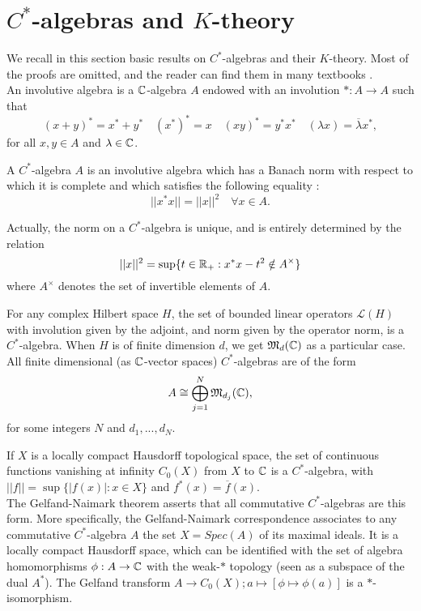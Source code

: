 \section{$C^*$-algebras and $K$-theory}

We recall in this section basic results on $C^*$-algebras and their $K$-theory. Most of the proofs are omitted, and the reader can find them in many textbooks \cite{Murphy}\cite{WeggeOlsen}.\\

An involutive algebra is a $\mathbb C$-algebra $A$ endowed with an involution $* : A\rightarrow A$ such that 
\[ (x+y)^*=x^*+y^* \quad (x^*)^* =x \quad (xy)^* = y^* x^* \quad (\lambda x ) = \overline{\lambda}x^*,\]
for all $x,y\in A$ and $\lambda\in\mathbb C$.
 
\begin{definition}
A $C^*$-algebra $A$ is an involutive algebra which has a Banach norm with respect to which it is complete and which satisfies the following equality :
\[ || x^* x || = || x ||^2\quad \forall x\in A. \]
\end{definition}

Actually, the norm on a $C^*$-algebra is unique, and is entirely determined by the relation
\[ ||x||^2 = \sup \{t\in \mathbb R_+ : x^*x-t^2 \notin A^{\times}\} \]
where $A^\times$ denotes the set of invertible elements of $A$.

\begin{Expl}
For any complex Hilbert space $H$, the set of bounded linear operators $\mathcal L(H)$ with involution given by the adjoint, and norm given by the operator norm, is a $C^*$-algebra. When $H$ is of finite dimension $d$, we get $\mathfrak M_d(\mathbb C)$ as a particular case.\\

All finite dimensional (as $\mathbb C$-vector spaces) $C^*$-algebras are of the form
\[A \cong \bigoplus_{j=1}^N \mathfrak M_{d_j}(\mathbb C),\]
for some integers $N$ and $d_1,...,d_N$.
\end{Expl}

\begin{Expl}
If $X$ is a locally compact Hausdorff topological space, the set of continuous functions vanishing at infinity $C_0(X)$ from $X$ to $\mathbb C$ is a $C^*$-algebra, with $||f||=\sup\{|f(x)| : x\in X\}$ and $f^*(x)=\overline f(x)$.\\

The Gelfand-Naimark theorem asserts that all commutative $C^*$-algebras are this form. More specifically, the Gelfand-Naimark correspondence associates to any commutative $C^*$-algebra $A$ the set $X=Spec(A)$ of its maximal ideals. It is a locally compact Hausdorff space, which can be identified with the set of algebra homomorphisms $\phi : A\rightarrow \mathbb C$ with the weak-$*$ topology (seen as a subspace of the dual $A^*$). The Gelfand transform $A\rightarrow C_0(X) ; a \mapsto [\phi\mapsto \phi(a)]$ is a $*$-isomorphism.
\end{Expl}

